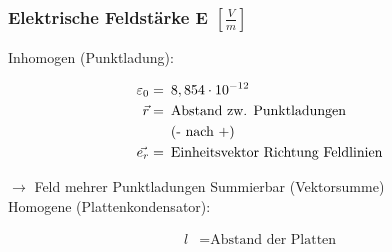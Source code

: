 \subsubsection{Elektrische Feldstärke E \hfill $\left[\frac{V}{m}\right]$}

    Inhomogen (Punktladung):
    \vspace{-1mm}
    \begin{minipage}{0.53\linewidth}
        \begin{footnotesize}
            \begin{center}
            \end{center}
        \end{footnotesize}
    \end{minipage}
    \vspace{1mm}
    \begin{minipage}{0.46\linewidth}
        \begin{scriptsize}
            \begin{center}
                \begin{align*}
                    \varepsilon_0 = &\enspace 8,854\cdot10^{-12}
                    \\\vec{r} = &\text{\enspace Abstand zw. Punktladungen}
                    \\&\text{\enspace(- nach +)}
                    \\\vec{e_r} = &\text{\enspace Einheitsvektor Richtung Feldlinien}
                \end{align*}
            \end{center}
        \end{scriptsize}
    \end{minipage}
    \vspace{2mm}
    $\longrightarrow$ Feld mehrer Punktladungen Summierbar (Vektorsumme)\\
    Homogene (Plattenkondensator):

    \begin{minipage}{0.53\linewidth}
        \begin{footnotesize}
            \begin{center}
            \end{center}
        \end{footnotesize}
    \end{minipage}
    \begin{minipage}{0.46\linewidth}
        \begin{scriptsize}
            \begin{center}
                \begin{align*}
                    l &= \text{Abstand der Platten}
                \end{align*}
            \end{center}
        \end{scriptsize}
    \end{minipage}
    \vspace{1mm}